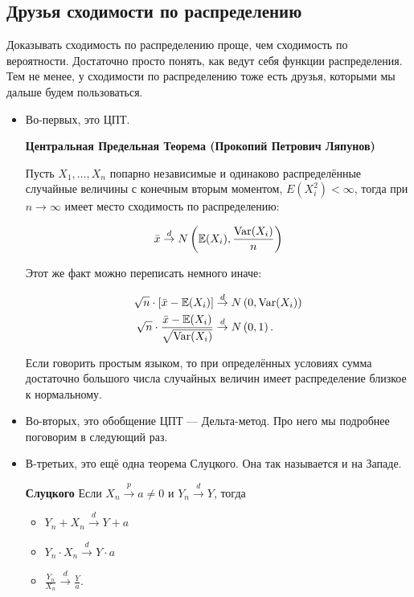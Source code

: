 \documentclass[12pt, a4paper, oneside]{article}
\begin{document}
\subsection{Друзья сходимости по распределению}

Доказывать сходимость по распределению проще, чем сходимость по вероятности. Достаточно просто понять, как ведут себя функции распределения. Тем не менее, у сходимости по распределению тоже есть друзья, которыми мы дальше будем пользоваться.

\begin{itemize} 
\item Во-первых, это ЦПТ. 

\begin{theorem}{\textbf{Центральная Предельная Теорема (Прокопий Петрович Ляпунов)}}

Пусть $X_1, \ldots, X_n$ попарно независимые и одинаково распределённые случайные величины с конечным вторым моментом, $E(X_i^2) < \infty$, тогда при $n \to \infty$ имеет место сходимость по распределению: 

$$
\bar{x} \overset{d}{\to} N \left(\mathbb{E}(X_i), \frac{\operatorname{Var}(X_i)}{n} \right)
$$

Этот же факт можно переписать немного иначе:

\begin{equation*}
\begin{aligned} 
\sqrt{n} \cdot [\bar{x} - \mathbb{E}(X_i)]  &\overset{d}{\to} N \left(0, \operatorname{Var}(X_i)\right)\\
\sqrt{n} \cdot \frac{\bar{x} - \mathbb{E}(X_i)}{\sqrt{\operatorname{Var}(X_i)}}  &\overset{d}{\to} N \left(0, 1\right).
\end{aligned} 
\end{equation*} 
\end{theorem}

Если говорить простым языком, то при определённых условиях сумма достаточно большого числа случайных величин имеет распределение близкое к нормальному. 

\item Во-вторых, это обобщение ЦПТ --- Дельта-метод. Про него мы подробнее поговорим в следующий раз. 

\item В-третьих, это ещё одна теорема Слуцкого. Она так называется и на Западе. 

\begin{theorem}{\textbf{Слуцкого}}
Если $X_n \overset{p}{\to} a \ne 0$ и $Y_n \overset{d}{\to} Y$, тогда 
\begin{itemize} 
\item $Y_n + X_n \overset{d}{\to} Y + a$
\item $Y_n \cdot X_n \overset{d}{\to} Y \cdot a$
\item $\frac{Y_n}{X_n} \overset{d}{\to} \frac{Y}{a}.$
\end{itemize}
\end{theorem}

\end{itemize} 
\end{document}
